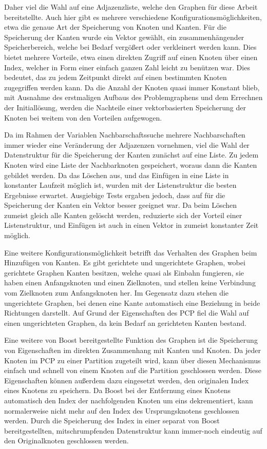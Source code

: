 Daher viel die Wahl auf eine Adjazenzliste, welche den Graphen für diese Arbeit bereitstellte. Auch hier gibt es mehrere verschiedene Konfigurationsmöglichkeiten, etwa die genaue Art der Speicherung von
Knoten und Kanten. Für die Speicherung der Kanten wurde ein Vektor gewählt, ein zusammenhängender Speicherbereich, welche bei Bedarf vergößert oder verkleinert werden kann. Dies bietet mehrere Vorteile, etwa
einen direkten Zugriff auf einen Knoten über einen Index, welcher in Form einer einfach ganzen Zahl leicht zu benützen war. Dies bedeutet, das zu jedem Zeitpunkt direkt auf einen bestimmten Knoten zugegriffen
werden kann. Da die Anzahl der Knoten quasi immer Konstant blieb, mit Ausnahme des erstmaligen Aufbaus des Problemgraphens und dem Errechnen der Initiallösung, werden die Nachteile einer vektorbasierten
Speicherung der Knoten bei weitem von den Vorteilen aufgewogen. 

Da im Rahmen der Variablen Nachbarschaftssuche mehrere Nachbarschaften immer wieder eine Veränderung der Adjazenzen vornehmen, viel die Wahl der Datenstruktur für die Speicherung der Kanten zunächst auf eine
Liste. Zu jedem Knoten wird eine Liste der Nachbarknoten gespeichert, woraus dann die Kanten gebildet werden. Da das Löschen aus, und das Einfügen in eine Liste in konstanter Laufzeit möglich ist, wurden
mit der Listenstruktur die besten Ergebnisse erwartet. Ausgiebige Tests ergaben jedoch, dass auf für die Speicherung der Kanten ein Vektor besser geeignet war. Da beim Löschen zumeist gleich alle
Kanten gelöscht werden, reduzierte sich der Vorteil einer Listenstruktur, und Einfügen ist auch in einen Vektor in zumeist konstanter Zeit möglich. 

Eine weitere Konfigurationsmöglichkeit betrifft das Verhalten des Graphen beim Hinzufügen von Kanten. Es gibt gerichtete und ungerichtete Graphen, wobei gerichtete Graphen Kanten besitzen, welche quasi
als Einbahn fungieren, sie haben einen Anfangsknoten und einen Zielknoten, und stellen keine Verbindung vom Zielknoten zum Anfangsknoten her. Im Gegensatz dazu stehen die ungerichtete Graphen, bei denen
eine Kante automatisch eine Beziehung in beide Richtungen darstellt. Auf Grund der Eigenschaften des PCP fiel die Wahl auf einen ungerichteten Graphen, da kein Bedarf an gerichteten Kanten bestand.

Eine weitere von Boost bereitgestellte Funktion des Graphen ist die Speicherung von Eigenschaften im direkten Zusammenhang mit Kanten und Knoten. Da jeder Knoten im PCP zu einer Partition zugeteilt wird, kann
über diesen Mechanismus einfach und schnell von einem Knoten auf die Partition geschlossen werden. Diese Eigenschaften können außerdem dazu eingesetzt werden, den originalen Index eines Knotens zu speichern.
Da Boost bei der Entfernung eines Knotens automatisch den Index der nachfolgenden Knoten um eins dekrementiert, kann normalerweise nicht mehr auf den Index des Ursprungsknotens geschlossen werden. Durch
die Speicherung des Index in einer separat von Boost bereitgestellten, mitschrumpfenden Datenstruktur kann immer-noch eindeutig auf den Originalknoten geschlossen werden. 

